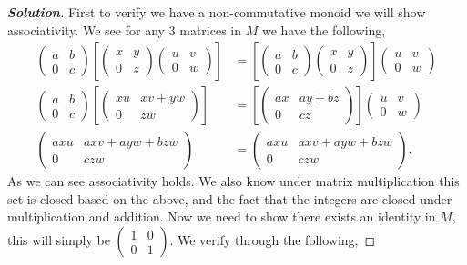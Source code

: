 \documentclass[11pt]{article}
\newenvironment{solution}{\begin{proof}[\textbf{\textit{Solution}}] }{\end{proof}}
\begin{document}
    \begin{solution}\newcommand{\pmat}{\begin{pmatrix}a & b \\ 0 & c\end{pmatrix}}
        \newcommand{\idm}{\begin{pmatrix}1 & 0 \\ 0 & 1 \end{pmatrix}}
        First to verify we have a non-commutative monoid we will show associativity. We see for any 3 matrices in $M$ we have the following,
        \begin{align*}
            \pmat \left[\begin{pmatrix} x & y \\ 0 & z\end{pmatrix} \begin{pmatrix}u & v \\ 0 & w \end{pmatrix}\right] &= \left[\pmat \begin{pmatrix} x & y \\ 0 & z\end{pmatrix} \right] \begin{pmatrix}u & v \\ 0 & w \end{pmatrix} \\
            \pmat \left[\begin{pmatrix}xu & xv + yw \\ 0 & zw \end{pmatrix}\right]&= \left[\begin{pmatrix}ax & ay + bz \\ 0 & cz \end{pmatrix}\right] \begin{pmatrix} u & v \\ 0 & w \end{pmatrix}\\
            \begin{pmatrix}axu & axv + ayw + bzw \\ 0 & czw \end{pmatrix}&=\begin{pmatrix}axu & axv + ayw + bzw \\ 0 & czw \end{pmatrix}.
        \end{align*}
        As we can see associativity holds. We also know under matrix multiplication this set is closed based on the above, and the fact that the integers are closed under multiplication and addition. Now we need to show there exists an identity in $M$, this will simply be $\begin{pmatrix}1 & 0 \\ 0 & 1 \end{pmatrix}$. We verify through the following,

\end{solution}
\end{document}
